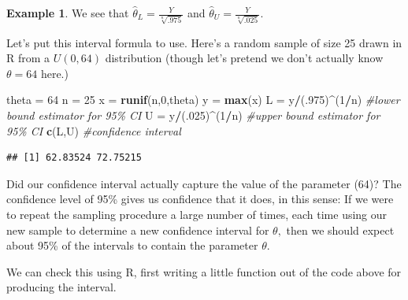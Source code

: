 \documentclass[
]{book}
\newenvironment{Shaded}{\begin{snugshade}}{\end{snugshade}}
\newcommand{\CommentTok}[1]{\textcolor[rgb]{0.56,0.35,0.01}{\textit{#1}}}
\newcommand{\DecValTok}[1]{\textcolor[rgb]{0.00,0.00,0.81}{#1}}
\newcommand{\FunctionTok}[1]{\textcolor[rgb]{0.13,0.29,0.53}{\textbf{#1}}}
\newcommand{\NormalTok}[1]{#1}
\newcommand{\OtherTok}[1]{\textcolor[rgb]{0.56,0.35,0.01}{#1}}
\newcommand{\SpecialCharTok}[1]{\textcolor[rgb]{0.81,0.36,0.00}{\textbf{#1}}}
\theoremstyle{definition}
\theoremstyle{definition}
\newtheorem{example}{Example}[chapter]
\theoremstyle{definition}
\theoremstyle{definition}
\theoremstyle{remark}
\begin{document}
\begin{example}
We see that \(\hat{\theta}_L = \frac{Y}{\sqrt[n]{.975}}\) and \(\hat{\theta}_U = \frac{Y}{\sqrt[n]{.025}}\).

Let's put this interval formula to use. Here's a random sample of size 25 drawn in R from a \(U(0,64)\) distribution (though let's pretend we don't actually know \(\theta = 64\) here.)

\begin{Shaded}
\begin{Highlighting}[]
\NormalTok{theta }\OtherTok{=} \DecValTok{64}
\NormalTok{n }\OtherTok{=} \DecValTok{25}
\NormalTok{x }\OtherTok{=} \FunctionTok{runif}\NormalTok{(n,}\DecValTok{0}\NormalTok{,theta)}
\NormalTok{y }\OtherTok{=} \FunctionTok{max}\NormalTok{(x)}
\NormalTok{L }\OtherTok{=}\NormalTok{ y}\SpecialCharTok{/}\NormalTok{(.}\DecValTok{975}\NormalTok{)}\SpecialCharTok{\^{}}\NormalTok{(}\DecValTok{1}\SpecialCharTok{/}\NormalTok{n) }\CommentTok{\#lower bound estimator for 95\% CI}
\NormalTok{U }\OtherTok{=}\NormalTok{ y}\SpecialCharTok{/}\NormalTok{(.}\DecValTok{025}\NormalTok{)}\SpecialCharTok{\^{}}\NormalTok{(}\DecValTok{1}\SpecialCharTok{/}\NormalTok{n) }\CommentTok{\#upper bound estimator for 95\% CI}
\FunctionTok{c}\NormalTok{(L,U) }\CommentTok{\#confidence interval}
\end{Highlighting}
\end{Shaded}

\begin{verbatim}
## [1] 62.83524 72.75215
\end{verbatim}

Did our confidence interval actually capture the value of the parameter (64)?
The confidence level of 95\% gives us confidence that it does, in this sense: If we were to repeat the sampling procedure a large number of times, each time using our new sample to determine a new confidence interval for \(\theta,\) then we should expect about 95\% of the intervals to contain the parameter \(\theta\).

We can check this using R, first writing a little function out of the code above for producing the interval.


\end{example}
\end{document}
